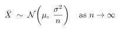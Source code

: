 \documentclass[preview]{standalone}
\begin{document}
\begin{align*}
\special{dvisvgm:raw <g id='unique000'>}\bar{X} \;\sim\; \mathcal{N}\!\left(\mu,\;\frac{\sigma^2}{n}\right)\quad \text{as } n \to \infty\special{dvisvgm:raw </g>}
\end{align*}
\end{document}
